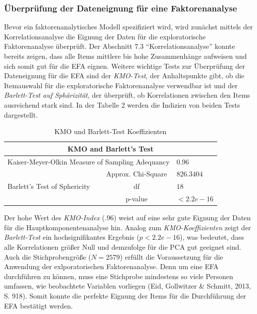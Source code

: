 \documentclass[12pt,a4paper]{article}
\begin{document}
\subsubsection{Überprüfung der Dateneignung für eine Faktorenanalyse} 

Bevor ein faktorenanalytisches Modell spezifiziert wird, wird zunächst mittels der Korrelationsanalyse die Eignung der Daten für die exploratorische Faktorenanalyse überprüft. Der Abschnitt 7.3 "`Korrelationsanalyse"' konnte bereits zeigen, dass alle Items mittlere bis hohe Zusammenhänge aufweisen und sich somit gut für die EFA eignen. Weitere wichtige Tests zur Überprüfung der Dateneignung für die EFA sind der \textit{KMO-Test}, der Anhaltspunkte gibt, ob die Itemauswahl für die exploratorische Faktorenanalyse verwendbar ist und der \textit{Barlett-Test auf Sphärizität}, der überprüft, ob Korrelationen zwischen den Items ausreichend stark sind. In der Tabelle 2 werden die Indizien von beiden Tests dargestellt.


\begin{table}
\caption{KMO und Barlett-Test Koeffizienten}
\label{tab_KMO}
\begin{tabular}{lcl}
\hline 
\multicolumn{3}{c}{KMO and Barlett's Test} \\ 
\hline 
\multicolumn{2}{l}{Kaiser-Meyer-Olkin Measure of Sampling Adequancy } &   $0.96$ \\ 

&      Approx. Chi-Square                  &  $826.3404$ \\ 

Barlett's Test of Sphericity  &   df  & $18$ \\ 

  &   p-value                         &  $< 2.2e-16 $ \\ 
\hline 
\end{tabular} 

\end{table}

Der hohe Wert des \textit{KMO-Index} ($.96$) weist auf eine sehr gute Eignung der Daten für die Hauptkomponentenanalyse hin. Analog zum \textit{KMO-Koeffizienten} zeigt der \textit{Barlett-Test} ein hochsignifikantes Ergebnis ($p < 2.2e-16$), was bedeutet, dass alle Korrelationen größer Null und demzufolge für die PCA gut geeignet sind. Auch die Stichprobengröße ($N = 2579$) erfüllt die Voraussetzung für die Anwendung der exlporatorischen Faktorenanalyse. Denn um eine EFA durchführen zu können, muss eine Stichprobe mindestens so viele Personen umfassen, wie beobachtete Variablen vorliegen (Eid, Gollwitzer \& Schmitt, 2013, S. 918). Somit konnte die perfekte Eignung der Items für die Durchführung der EFA bestätigt werden.
\end{document}
